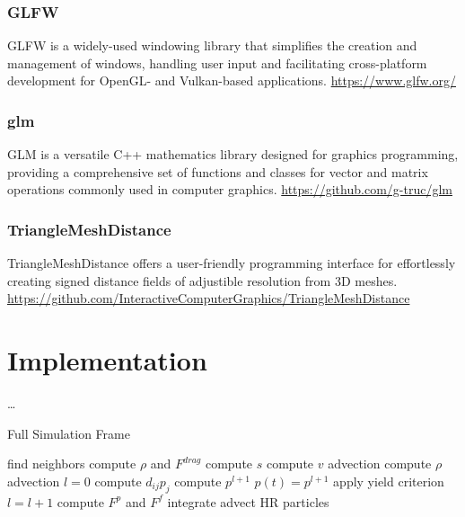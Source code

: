 \documentclass[intern]{cgMA}
\begin{document}
    \subsubsection*{GLFW}
    GLFW is a widely-used windowing library that simplifies the creation and management of windows, handling user input and facilitating cross-platform development for OpenGL- and Vulkan-based applications. \url{https://www.glfw.org/}

    \subsubsection*{glm}
    GLM is a versatile C++ mathematics library designed for graphics programming, providing a comprehensive set of functions and classes for vector and matrix operations commonly used in computer graphics. \url{https://github.com/g-truc/glm}

    \subsubsection*{TriangleMeshDistance}
    TriangleMeshDistance offers a user-friendly programming interface for effortlessly creating signed distance fields of adjustible resolution from 3D meshes. \url{https://github.com/InteractiveComputerGraphics/TriangleMeshDistance}

    \pagebreak
    \section{Implementation}\label{sec:impl}
    \dots
    
    \begin{algorithm}
        \caption{Full Simulation Frame}
        \begin{algorithmic}[1]
        \State find neighbors 
        \State compute $\rho$ and $F^{drag}$ 
        \State compute $s$ 
        \State compute $v$ advection 
        \State compute $\rho$ advection 
        \State $l = 0$
            \State compute $d_{ij}p_{j}$
            \State compute $p^{l+1}$
            \State $p(t) = p^{l+1}$
            \State apply yield criterion 
            \State $l = l+1$
        \EndWhile
        \State compute $F^p$ and $F^f$ 
        \State integrate 
        \State advect HR particles 
        \end{algorithmic}
    \end{algorithm}
\end{document}
